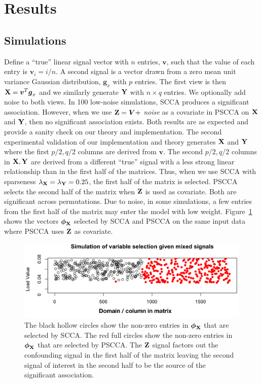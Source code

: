 \documentclass{llncs}
\newcommand{\X}{{\bf X}}
\newcommand{\Y}{{\bf Y}}
\newcommand{\Z}{{\bf Z}}
\newcommand{\bs}{\boldsymbol}
\begin{document}
\section{Results}
\subsection{Simulations} Define a ``true'' linear signal vector with
$n$ entries, ${\bs v}$, such that the value of each entry is ${\bs
v}_i=i/n$.  A second signal is a vector drawn from a zero mean unit
variance Gaussian distribution, ${\bs g_x}$ with $p$ entries.  The
first view is then $\X ={\bs v}^T {\bs g_x}$ and we similarly generate
$\Y $ with $n \times q$ entries.  We optionally add noise to both
views.  In 100 low-noise simulations, SCCA produces a significant
association.  However, when we use $\Z = {\bs V} + $ {\em noise} as a
covariate in PSCCA on $\X$ and $\Y$, then no significant association
exists.  Both results are as expected and provide a sanity check on
our theory and implementation.  The second experimental validation of
our implementation and theory generates $\X$ and $\Y$ where the first
$p/2, q/2$ columns are derived from ${\bs v}$.  The second $p/2, q/2$
columns in $\X, \Y$ are derived from a different ``true'' signal with
a less strong linear relationship than in the first half of the
matrices.  Thus, when we use SCCA with sparseness
$\lambda_{\X}=\lambda_{\Y}=0.25$, the first half of the matrix is
selected.  PSCCA selects the second half of the matrix when $\Z$ is
used as covariate.  Both are significant across permutations.  Due to
noise, in some simulations, a few entries from the first half of the
matrix may enter the model with low weight.  Figure~\ref{fig:sim}
shows the vectors $\bs\phi_{\X}$ selected by SCCA and PSCCA on the
same input data where PSCCA uses $\Z$ as covariate.
\begin{figure}
\label{fig:sim}
\begin{center}
\includegraphics[width=120mm]{simulation_result_mix.pdf} 
\end{center}
\caption{The black hollow circles show the non-zero entries in
  $\bs\phi_{\X}$ that are selected by SCCA.  The red full circles show the non-zero entries in
  $\bs\phi_{\X}$ that are selected by PSCCA.  The $\Z$ signal factors
  out the confounding signal in the first half of the matrix leaving
  the second signal of interest in the second half to be the source of
the significant association.}
\end{figure}
\end{document}
